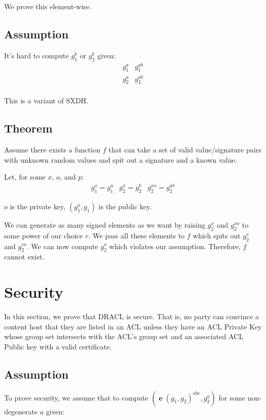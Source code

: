 \documentclass[pdftex,12pt,a4papaer,twoside,notitlepage]{report}
\DeclareMathOperator{\e}{\mathbf{e}}
\begin{document}
\begin{appendices}
We prove this element-wise.

\subsection{Assumption}

It's hard to compute $g_1^{b}$ or $g_2^{b}$ given:
\begin{align*}
  g_1^a & g_1^{ab} \\
  g_2^a & g_2^{ab} \\
\end{align*}

This is a variant of SXDH.

\subsection{Theorem}

Assume there exists a function $f$ that can take a set of valid value/signature
pairs with unknown random values and spit out a signature and a known value. 

Let, for some $x$, $o$, and $p$:
\begin{align*}
g_1^o = g_1^a & g_2^x = g_2^b & g_2^{xo} = g_2^{ab}
\end{align*}

$o$ is the private key, $(g_1^o, g_1)$ is the public key.

We can generate as many signed elements as we want by raising $g_2^x$ and
$g_2^{xo}$ to some power of our choice $r$. We pass all these elements to $f$
which spits out $g_2^v$ and $g_2^{vo}$. We can now compute $g_2^{o}$ which
violates our assumption. Therefore, $f$ cannot exist.

\section{Security}
\label{sec:crypto-sec}

In this section, we prove that DRACL is secure. That is, no party can convince a
content host that they are listed in an ACL unless they have an ACL Private Key
whose group set intersects with the ACL's group set and an associated ACL Public
key with a valid certificate.

\subsection{Assumption}

To prove security, we assume that to compute $(\e(g_1, g_2)^{abc}, g_2^a)$ for
some non-degenerate $a$ given:


\end{appendices}
\end{document}
